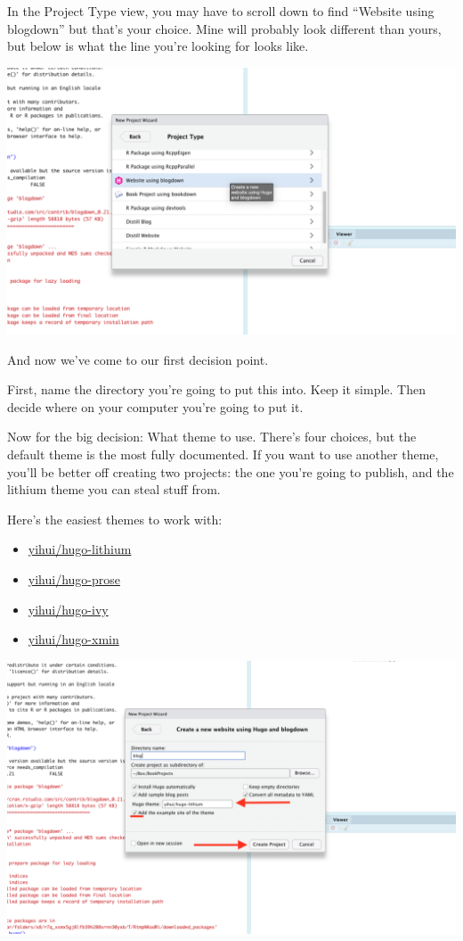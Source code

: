 \documentclass[
]{book}
\providecommand{\tightlist}{%
  \setlength{\itemsep}{0pt}\setlength{\parskip}{0pt}}
\begin{document}
In the Project Type view, you may have to scroll down to find ``Website using blogdown'' but that's your choice. Mine will probably look different than yours, but below is what the line you're looking for looks like.

\includegraphics[width=15.39in]{images/blog2}

And now we've come to our first decision point.

First, name the directory you're going to put this into. Keep it simple. Then decide where on your computer you're going to put it.

Now for the big decision: What theme to use. There's four choices, but the default theme is the most fully documented. If you want to use another theme, you'll be better off creating two projects: the one you're going to publish, and the lithium theme you can steal stuff from.

Here's the easiest themes to work with:

\begin{itemize}
\tightlist
\item
  \href{https://github.com/yihui/hugo-lithium}{yihui/hugo-lithium}
\item
  \href{https://github.com/yihui/hugo-prose}{yihui/hugo-prose}
\item
  \href{https://github.com/yihui/hugo-ivy}{yihui/hugo-ivy}
\item
  \href{https://github.com/yihui/hugo-xmin}{yihui/hugo-xmin}
\end{itemize}

\includegraphics[width=16.58in]{images/blog3}
\end{document}
